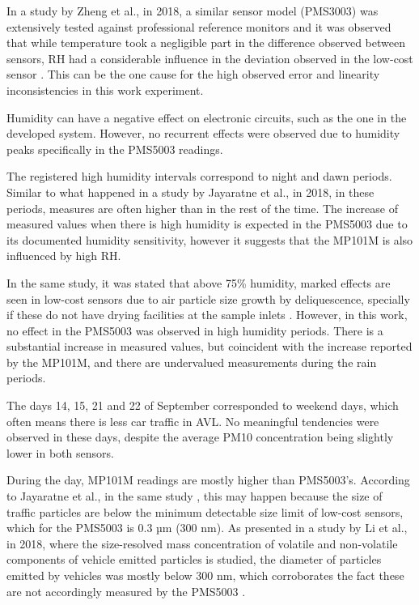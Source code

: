 In a study by Zheng et al., in 2018, a similar sensor model (PMS3003) was extensively tested against professional reference monitors and it was observed that while temperature took a negligible part in the difference observed between sensors, RH had a considerable influence in the deviation observed in the low-cost sensor \cite{Zheng2018}. This can be the one cause for the high observed error and linearity inconsistencies in this work experiment.

Humidity can have a negative effect on electronic circuits, such as the one in the developed system. However, no recurrent effects were observed due to humidity peaks specifically in the PMS5003 readings.

The registered high humidity intervals correspond to night and dawn periods. Similar to what happened in a study by Jayaratne et al., in 2018, in these periods, measures are often higher than in the rest of the time. The increase of measured values when there is high humidity is expected in the PMS5003 due to its documented humidity sensitivity, however it suggests that the MP101M is also influenced by high RH.

In the same study, it was stated that above 75\% humidity, marked effects are seen in low-cost sensors due to air particle size growth by deliquescence, specially if these do not have drying facilities at the sample inlets \cite{Jayaratne2018}. However, in this work, no effect in the PMS5003 was observed in high humidity periods. There is a substantial increase in measured values, but coincident with the increase reported by the MP101M, and there are undervalued measurements during the rain periods.

The days 14, 15, 21 and 22 of September corresponded to weekend days, which often means there is less car traffic in AVL. No meaningful tendencies were observed in these days, despite the average PM10 concentration being slightly lower in both sensors.

During the day, MP101M readings are mostly higher than PMS5003's.
According to Jayaratne et al., in the same study \cite{Jayaratne2018}, this may happen because the size of traffic particles are below the minimum detectable size limit of low-cost sensors, which for the PMS5003 is 0.3 µm (300 nm). As presented in a study by Li et al., in 2018, where the size-resolved mass concentration of volatile and non-volatile components of vehicle emitted particles is studied, the diameter of particles emitted by vehicles was mostly below 300 nm, which corroborates the fact these are not accordingly measured by the PMS5003 \cite{Li2018}.

